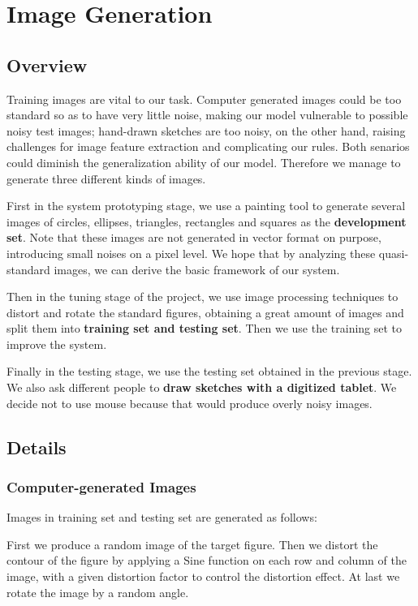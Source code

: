 \section{Image Generation}

\subsection{Overview}

Training images are vital to our task. Computer generated images could be too standard so as to have very little noise, making our model vulnerable to possible noisy test images; hand-drawn sketches are too noisy, on the other hand, raising challenges for image feature extraction and complicating our rules. Both senarios could diminish the generalization ability of our model. Therefore we manage to generate three different kinds of images.

First in the system prototyping stage, we use a painting tool to generate several images of circles, ellipses, triangles, rectangles and squares as the \textbf{development set}. Note that these images are not generated in vector format on purpose, introducing small noises on a pixel level. We hope that by analyzing these quasi-standard images, we can derive the basic framework of our system.

Then in the tuning stage of the project, we use image processing techniques to distort and rotate the standard figures, obtaining a great amount of images and split them into \textbf{training set and testing set}. Then we use the training set to improve the system.

Finally in the testing stage, we use the testing set obtained in the previous stage. We also ask different people to \textbf{draw sketches with a digitized tablet}. We decide not to use mouse because that would produce overly noisy images.

\subsection{Details}

\subsubsection{Computer-generated Images}

Images in training set and testing set are generated as follows:

First we produce a random image of the target figure. Then we distort the contour of the figure by applying a Sine function on each row and column of the image, with a given distortion factor to control the distortion effect. At last we rotate the image by a random angle.

